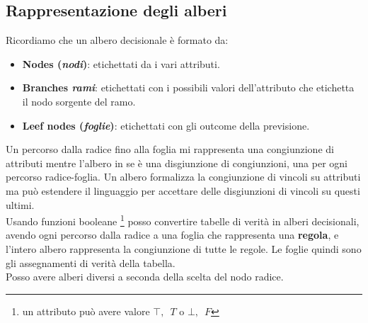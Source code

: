 \subsection{Rappresentazione degli alberi}
Ricordiamo che un albero decisionale è formato da:
\begin{itemize}
  \item \textbf{Nodes (\textit{nodi})}: etichettati da i vari attributi.
  \item \textbf{Branches \textit{rami}}: etichettati con i possibili valori
  dell'attributo che etichetta il nodo sorgente del ramo.
  \item \textbf{Leef nodes (\textit{foglie})}: etichettati con gli outcome della
  previsione.
\end{itemize}
Un percorso dalla radice fino alla foglia mi rappresenta una congiunzione di
attributi mentre l'albero in se è una disgiunzione di congiunzioni, una
per ogni percorso radice-foglia. Un albero formalizza la congiunzione di
vincoli su attributi ma può estendere il linguaggio per accettare delle disgiunzioni di vincoli su questi ultimi.\\
Usando funzioni booleane \footnote{un attributo può avere valore $\top,\,\,\, T$ o
$\bot,\,\,\, F$} posso convertire tabelle di verità in alberi decisionali, avendo ogni percorso dalla radice a una foglia che rappresenta una
\textbf{regola}, e l'intero albero rappresenta la congiunzione di tutte le
regole. Le foglie quindi sono gli assegnamenti di verità della tabella.\\ 
Posso avere alberi diversi a seconda della scelta del nodo radice.\\
